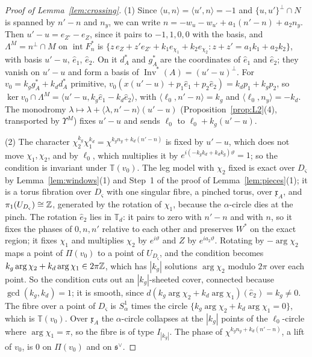 \begin{proof}[Proof of Lemma~\ref{lem:crossing}]
(1) Since $\langle u,n\rangle=\langle u',n\rangle=-1$ and $\{u,u'\}^\perp\cap N$ is spanned by $n'-n$ and $n_y$, we can write
$n=-w_u-w_{u'}+a_1(n'-n)+a_2n_y$. Then $u'-u=e_{Z'}-e_Z$, since it pairs to $-1,1,0,0$ with the basis, and
$\Lambda^M=n^\perp\cap M$ on $\operatorname{int}F^*_n$ is $\{z\,e_Z+z'e_{Z'}+k_1e_{\chi_1}+k_2e_{\chi_2}:z+z'=a_1k_1+a_2k_2\}$,
with basis $u'-u$, $\hat e_1$, $\hat e_2$. On it $d^*_A$ and $g^*_A$ are the coordinates of $\hat e_1$ and $\hat e_2$; they
vanish on $u'-u$ and form a basis of $\operatorname{Inv}^*(A)=(u'-u)^\perp$. For $v_0=k_g g^*_A+k_d d^*_A$ primitive,
$v_0(x(u'-u)+p_1\hat e_1+p_2\hat e_2)=k_d p_1+k_g p_2$, so $\ker v_0\cap\Lambda^M=\langle u'-u,k_g\hat e_1-k_d\hat e_2\rangle$, with
$\langle\ell_0,n'-n\rangle=k_g$ and $\langle\ell_0,n_y\rangle=-k_d$. The monodromy $\lambda\mapsto\lambda+\langle\lambda,n'-n\rangle(u'-u)$
(Proposition~\ref{prop:L2}(4), transported by $\Upsilon^M$) fixes $u'-u$ and sends $\ell_0$ to $\ell_0+k_g(u'-u)$.

(2) The character $\chi_2^{k_g}\chi_1^{k_d}=\chi^{k_g n_y+k_d(n'-n)}$ is fixed by $u'-u$, which does not move $\chi_1,\chi_2$, and by
$\ell_0$, which multiplies it by $e^{i(-k_g k_d+k_d k_g)\vartheta}=1$; so the condition is invariant under $\mathbb T(v_0)$. The leg
model with $\chi_2$ fixed is exact over $D_\varsigma$ by Lemma~\ref{lem:windows}(1) and Step~1 of the proof of
Lemma~\ref{lem:pieces}(1); it is a torus fibration over $D_\varsigma$ with one singular fibre, a pinched torus, over
$\mathfrak x_A$, and $\pi_1(U_{D_\varsigma})\cong\mathbb Z$, generated by the rotation of $\chi_1$, because the $\alpha$-circle dies
at the pinch. The rotation $\hat e_2$ lies in $\mathbb T_d$: it pairs to zero with $n'-n$ and with $n$, so it fixes the
phases of $0,n,n'$ relative to each other and preserves $W^*$ on the exact region; it fixes $\chi_1$ and multiplies $\chi_2$
by $e^{i\vartheta}$ and $Z$ by $e^{ia_2\vartheta}$. Rotating by $-\arg\chi_2$ maps a point of $\Pi(v_0)$ to a point of
$U_{D_\varsigma}$, and the condition becomes $k_g\arg\chi_2+k_d\arg\chi_1\in2\pi\mathbb Z$, which has $|k_g|$ solutions
$\arg\chi_2$ modulo $2\pi$ over each point. So the condition cuts out an $|k_g|$-sheeted cover, connected because
$\gcd(k_g,k_d)=1$; it is smooth, since $d(k_g\arg\chi_2+k_d\arg\chi_1)(\hat e_2)=k_g\ne0$. The fibre over a point of
$D_\varsigma$ is $S^1_\alpha$ times the circle $\{k_g\arg\chi_2+k_d\arg\chi_1=0\}$,
which is $\mathbb T(v_0)$. Over $\mathfrak x_A$ the $\alpha$-circle collapses at the $|k_g|$ points of the $\ell_0$-circle
where $\arg\chi_1=\pi$, so the fibre is of type $I_{|k_g|}$. The phase of $\chi^{k_g n_y+k_d(n'-n)}$, a lift of $v_0$, is $0$ on
$\Pi(v_0)$ and on $\mathfrak s^\vee$.


\end{proof}
